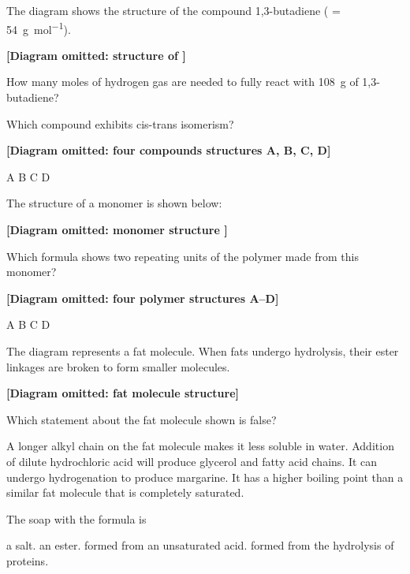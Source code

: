 \documentclass[11pt]{exam}
\begin{document}
\begin{questions}
\newpage

\question The diagram shows the structure of the compound 1,3-butadiene ( = \qty{54}{\g\per\mol}).

\textbf{[Diagram omitted: structure of ]}

How many moles of hydrogen gas are needed to fully react with \qty{108}{\g} of 1,3-butadiene?

\begin{choices}
\end{choices}

\question Which compound exhibits cis-trans isomerism?

\textbf{[Diagram omitted: four compounds structures A, B, C, D]}

\begin{choices}
\choice A
\choice B
\choice C
\choice D
\end{choices}

\question The structure of a monomer is shown below:

\textbf{[Diagram omitted: monomer structure ]}

Which formula shows two repeating units of the polymer made from this monomer?

\textbf{[Diagram omitted: four polymer structures A--D]}

\begin{choices}
\choice A
\choice B
\choice C
\choice D
\end{choices}

\question The diagram represents a fat molecule. When fats undergo hydrolysis, their ester linkages are broken to form smaller molecules.

\textbf{[Diagram omitted: fat molecule structure]}

Which statement about the fat molecule shown is false?

\begin{choices}
\choice A longer alkyl chain on the fat molecule makes it less soluble in water.
\choice Addition of dilute hydrochloric acid will produce glycerol and fatty acid chains.
\choice It can undergo hydrogenation to produce margarine.
\choice It has a higher boiling point than a similar fat molecule that is completely saturated.
\end{choices}

\question The soap with the formula  is

\begin{choices}
\choice a salt.
\choice an ester.
\choice formed from an unsaturated acid.
\choice formed from the hydrolysis of proteins.
\end{choices}

\end{questions}
\end{document}
